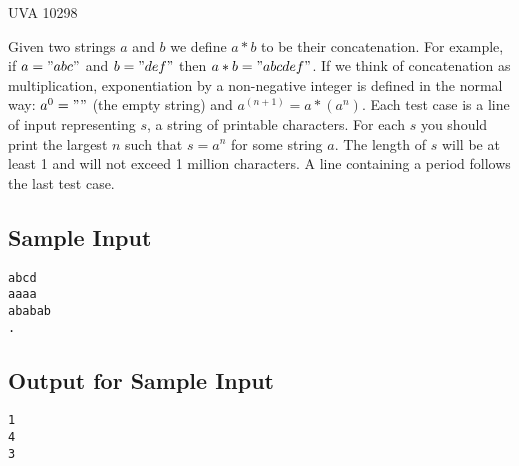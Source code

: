 

\noindent
UVA 10298\bigskip

Given two strings $a$ and $b$ we define $a*b$ to be their concatenation. For example, if $a = "abc"$ and $b = "def"$ then $a*b = "abcdef"$. If we think of concatenation as multiplication, exponentiation by a non-negative integer is defined in the normal way: $a^0 = ""$ (the empty string) and $a^(n+1) = a*(a^n)$.
Each test case is a line of input representing $s$, a string of printable characters. For each $s$ you should print the largest $n$ such that $s = a^n$ for some string $a$. The length of $s$ will be at least 1 and will not exceed 1 million characters. A line containing a period follows the last test case.

\subsection*{Sample Input}

\begin{verbatim}
abcd
aaaa
ababab
.
\end{verbatim}

\subsection*{Output for Sample Input}

\begin{verbatim}
1
4
3
\end{verbatim}
